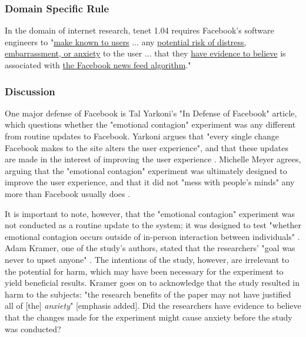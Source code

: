 \subsubsection{Domain Specific Rule}
In the domain of internet research, tenet 1.04 requires Facebook's software engineers to "\uline{make known to users} ... any \uline{potential risk of distress, embarrassment, or anxiety} to the user ... that they \uline{have evidence to believe} is associated with \uline{the Facebook news feed algorithm}."

\subsubsection{Discussion}

One major defense of Facebook is Tal Yarkoni's "In Defense of Facebook" article, which questions whether the "emotional contagion" experiment was any different from routine updates to Facebook.  Yarkoni argues that "every single change Facebook makes to the site alters the user experience", and that these updates are made in the interest of improving the user experience \cite{defense}.  Michelle Meyer agrees, arguing that the "emotional contagion" experiment was ultimately designed to improve the user experience, and that it did not "mess with people's minds" any more than Facebook usually does \cite{misjudgements}.  \par
It is important to note, however, that the "emotional contagion" experiment was not conducted as a routine update to the system; it was designed to test "whether emotional contagion occurs outside of in-person interaction between individuals" \cite{study}.  Adam Kramer, one of the study's authors, stated that the researchers' "goal was never to upset anyone" \cite{atlantic}.  The intentions of the study, however, are irrelevant to the potential for harm, which may have been necessary for the experiment to yield beneficial results.  Kramer goes on to acknowledge that the study resulted in harm to the subjects: "the research benefits of the paper may not have justified all of [the] \textit{anxiety}" [emphasis added].  Did the researchers have evidence to believe that the changes made for the experiment might cause anxiety before the study was conducted? \par
